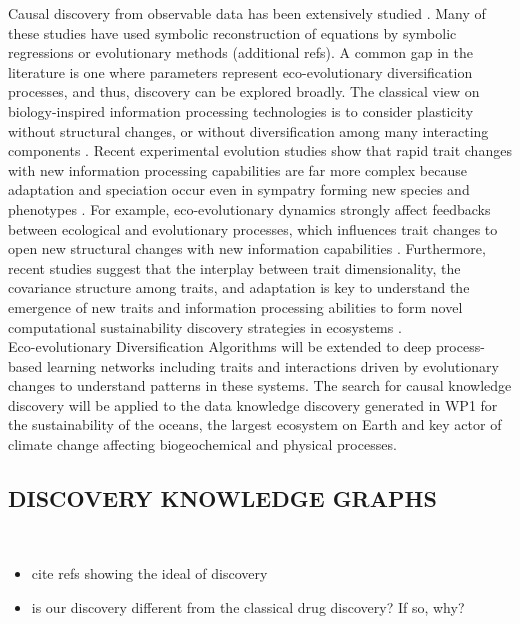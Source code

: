 \documentclass[12pt,a4paper]{article}
\begin{document}
Causal discovery from observable data has been extensively studied \cite{Rackauckas2020}. Many of these studies have used symbolic reconstruction of equations by symbolic regressions or evolutionary methods \cite{Koza1992} (additional refs). A common gap in the literature is one where parameters represent eco-evolutionary diversification processes, and thus, discovery can be explored broadly. The classical view on biology-inspired information processing technologies is to consider plasticity without structural changes, or without diversification among many interacting components \cite{DARWISH2018231}. Recent experimental evolution studies show that rapid trait changes with new information processing capabilities are far more complex because adaptation and speciation occur even in sympatry forming new species and phenotypes \cite{Seehausen2014}. For example, eco-evolutionary dynamics strongly affect feedbacks between ecological and evolutionary processes, which influences trait changes to open new structural changes with new information capabilities \cite{Govaertetal2019}. Furthermore, recent studies suggest that the interplay between trait dimensionality, the covariance structure among traits, and adaptation is key to understand the emergence of new traits and information processing abilities to form novel computational sustainability discovery strategies in ecosystems \cite{zora172044}.\\

Eco-evolutionary Diversification Algorithms will be extended to deep process-based learning networks including traits and interactions driven by evolutionary changes to understand patterns in these systems. The search for causal knowledge discovery will be applied to the data knowledge discovery generated in WP1 for the sustainability of the oceans, the largest ecosystem on Earth and key actor of climate change affecting biogeochemical and physical processes. 

\subsection{DISCOVERY KNOWLEDGE GRAPHS}
\\
\begin{itemize}
    \item cite refs showing the ideal of discovery
    \item is our discovery different from the classical drug discovery? If so, why?
\end{itemize}
\end{document}

